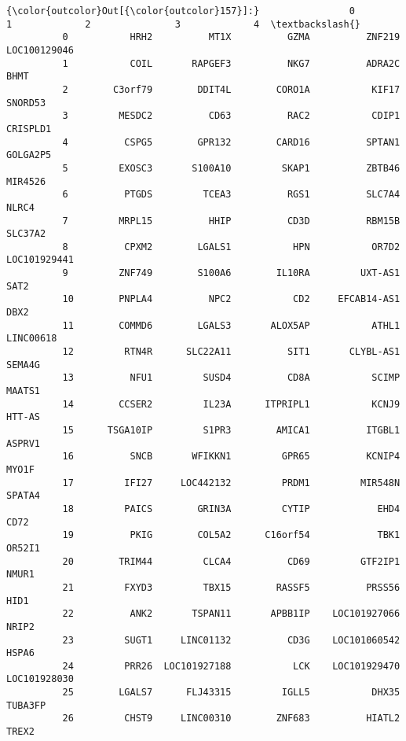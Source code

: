 \documentclass[11pt]{article}
\begin{document}
\begin{Verbatim}[commandchars=\\\{\}]
{\color{outcolor}Out[{\color{outcolor}157}]:}                0             1             2               3             4  \textbackslash{}
          0           HRH2          MT1X          GZMA          ZNF219  LOC100129046   
          1           COIL       RAPGEF3          NKG7          ADRA2C          BHMT   
          2        C3orf79        DDIT4L        CORO1A           KIF17       SNORD53   
          3         MESDC2          CD63          RAC2           CDIP1      CRISPLD1   
          4          CSPG5        GPR132        CARD16          SPTAN1      GOLGA2P5   
          5         EXOSC3       S100A10         SKAP1          ZBTB46       MIR4526   
          6          PTGDS         TCEA3          RGS1          SLC7A4         NLRC4   
          7         MRPL15          HHIP          CD3D          RBM15B       SLC37A2   
          8          CPXM2        LGALS1           HPN           OR7D2  LOC101929441   
          9         ZNF749        S100A6        IL10RA         UXT-AS1          SAT2   
          10        PNPLA4          NPC2           CD2     EFCAB14-AS1          DBX2   
          11        COMMD6        LGALS3       ALOX5AP           ATHL1     LINC00618   
          12         RTN4R      SLC22A11          SIT1       CLYBL-AS1        SEMA4G   
          13          NFU1         SUSD4          CD8A           SCIMP        MAATS1   
          14        CCSER2         IL23A      ITPRIPL1           KCNJ9        HTT-AS   
          15      TSGA10IP         S1PR3        AMICA1          ITGBL1        ASPRV1   
          16          SNCB       WFIKKN1         GPR65          KCNIP4         MYO1F   
          17         IFI27     LOC442132         PRDM1         MIR548N        SPATA4   
          18         PAICS        GRIN3A         CYTIP            EHD4          CD72   
          19          PKIG        COL5A2      C16orf54            TBK1        OR52I1   
          20        TRIM44         CLCA4          CD69         GTF2IP1         NMUR1   
          21         FXYD3         TBX15        RASSF5          PRSS56          HID1   
          22          ANK2       TSPAN11       APBB1IP    LOC101927066         NRIP2   
          23         SUGT1     LINC01132          CD3G    LOC101060542         HSPA6   
          24         PRR26  LOC101927188           LCK    LOC101929470  LOC101928030   
          25        LGALS7      FLJ43315         IGLL5           DHX35       TUBA3FP   
          26         CHST9     LINC00310        ZNF683          HIATL2         TREX2   

\end{Verbatim}
\end{document}
